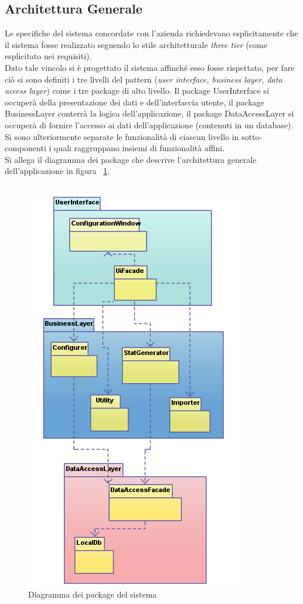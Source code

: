 \documentclass[a4paper,13pt,twoside]{article}
\begin{document}
\subsection{Architettura Generale} \label{sec:archgen}
Le specifiche del sistema concordate con l'azienda richiedevano esplicitamente che il sistema fosse realizzato seguendo lo stile architetturale \textit{three tier} (come esplicitato nei requisiti).  \\
Dato tale vincolo si è progettato il sistema affinché esso fosse rispettato, per fare ciò si sono definiti i tre livelli del pattern (\textit{user interface, business layer, data access layer}) come i tre package di alto livello. Il package UserInterface si occuperà della presentazione dei dati e dell'interfaccia utente, il package BusinessLayer conterrà la logica dell'applicazione, il package DataAccessLayer si occuperà di fornire l'accesso ai dati dell'applicazione (contenuti in un database). Si sono ulteriormente separate le funzionalità di ciascun livello in sotto-componenti i quali raggruppano insiemi di funzionalità affini. \\
Si allega il diagramma dei package che descrive l'architettura generale dell'applicazione in figura ~\ref{fig:archgen}.\\\\
\begin{figure}[htpb]
\centering
\includegraphics[scale=0.5]{./images/archgen.png}
\caption{Diagramma dei package del sistema}
\label{fig:archgen}
\end{figure}
\end{document}
